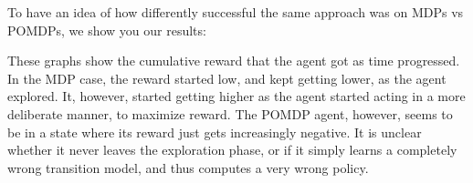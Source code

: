 \documentclass{pset}
\begin{document}
To have an idea of how differently successful the same approach was on MDPs vs
POMDPs, we show you our results:


These graphs show the cumulative reward that the agent got as time progressed.
In the MDP case, the reward started low, and kept getting lower, as the agent
explored. It, however, started getting higher as the agent started acting in a
more deliberate manner, to maximize reward. The POMDP agent, however, seems to
be in a state where its reward just gets increasingly negative. It is unclear
whether it never leaves the exploration phase, or if it simply learns a completely
wrong transition model, and thus computes a very wrong policy.






\end{document}
